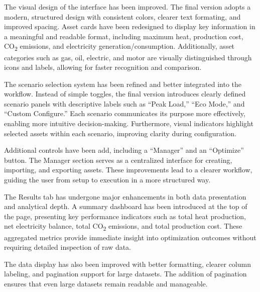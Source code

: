 \hspace*{1cm}The visual design of the interface has been improved. The final version adopts a modern, structured design with consistent colors, clearer text formating, and improved spacing. Asset cards have been redesigned to display key information in a meaningful and readable format, including maximum heat, production cost, CO\textsubscript{2} emissions, and electricity generation/consumption. Additionally, asset categories such as gas, oil, electric, and motor are visually distinguished through icons and labels, allowing for faster recognition and comparison.

\hspace*{1cm}The scenario selection system has been refined and better integrated into the workflow. Instead of simple toggles, the final version introduces clearly defined scenario panels with descriptive labels such as “Peak Load,” “Eco Mode,” and “Custom Configure.” Each scenario communicates its purpose more effectively, enabling more intuitive decision-making. Furthermore, visual indicators highlight selected assets within each scenario, improving clarity during configuration.

\hspace*{1cm}Additional controls have been add, including a “Manager” and an “Optimize” button. The Manager section serves as a centralized interface for creating, importing, and exporting assets. These improvements lead to a clearer workflow, guiding the user from setup to execution in a more structured way.

\hspace*{1cm}The Results tab has undergone major enhancements in both data presentation and analytical depth. A summary dashboard has been introduced at the top of the page, presenting key performance indicators such as total heat production, net electricity balance, total CO\textsubscript{2} emissions, and total production cost. These aggregated metrics provide immediate insight into optimization outcomes without requiring detailed inspection of raw data.

\hspace*{1cm}The data display has also been improved with better formatting, clearer column labeling, and pagination support for large datasets. The addition of pagination ensures that even large datasets remain readable and manageable.

